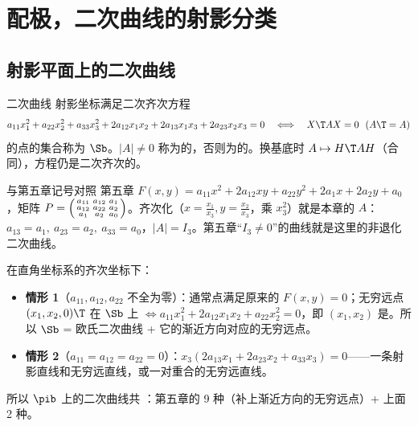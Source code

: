 \section{配极，二次曲线的射影分类}

\subsection{射影平面上的二次曲线}

\begin{defbox}{二次曲线}
射影坐标满足二次齐次方程
\begin{equation}
a_{11}x_1^2+a_{22}x_2^2+a_{33}x_3^2+2a_{12}x_1x_2+2a_{13}x_1x_3+2a_{23}x_2x_3=0
\quad\Longleftrightarrow\quad X\T AX=0\ \ (A\T=A)
\end{equation}
的点的集合称为 $\Sb$。$|A|\neq0$ 称为的，否则为的。换基底时 $A\mapsto H\T AH$（合同），方程仍是二次齐次的。
\end{defbox}

\begin{gdbox}{与第五章记号对照}
第五章 $F(x,y)=a_{11}x^2+2a_{12}xy+a_{22}y^2+2a_1x+2a_2y+a_0$，矩阵 $P=\begin{psmallmatrix}a_{11}&a_{12}&a_1\\a_{12}&a_{22}&a_2\\a_1&a_2&a_0\end{psmallmatrix}$。齐次化（$x=\frac{x_1}{x_3},y=\frac{x_2}{x_3}$，乘 $x_3^2$）就是本章的 $A$：$a_{13}=a_1,\ a_{23}=a_2,\ a_{33}=a_0$，$|A|=I_3$。第五章“$I_3\neq0$”的曲线就是这里的非退化二次曲线。
\end{gdbox}

在直角坐标系的齐次坐标下：
\begin{itemize}
\item \textbf{情形 1}（$a_{11},a_{12},a_{22}$ 不全为零）：通常点满足原来的 $F(x,y)=0$；无穷远点 $(x_1,x_2,0)\T$ 在 $\Sb$ 上 $\iff a_{11}x_1^2+2a_{12}x_1x_2+a_{22}x_2^2=0$，即 $(x_1,x_2)$ 是。所以 $\Sb$ = 欧氏二次曲线 + 它的渐近方向对应的无穷远点。
\item \textbf{情形 2}（$a_{11}=a_{12}=a_{22}=0$）：$x_3(2a_{13}x_1+2a_{23}x_2+a_{33}x_3)=0$——一条射影直线和无穷远直线，或一对重合的无穷远直线。
\end{itemize}
所以 $\pib$ 上的二次曲线共 ：第五章的 9 种（补上渐近方向的无穷远点）+ 上面 2 种。

